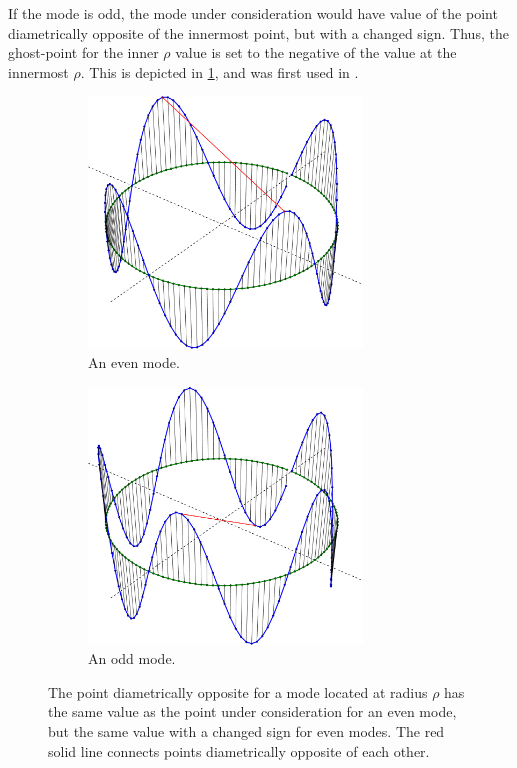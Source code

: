 If the mode is odd, the mode under consideration would have value of the point diametrically opposite of the innermost point, but with a changed sign.
Thus, the ghost-point for the inner $\rho$ value is set to the negative of the value at the innermost $\rho$.
This is depicted in \cref{fig:BCLaplace}, and was first used in \cite{Naulin2008}.
%
\begin{figure}[h!]
    \centering
    \begin{subfigure}[t]{0.5\textwidth}
        \centering
        \includegraphics[width=0.8\textwidth]{fig/mode_4}
        \caption{An even mode.}
    \end{subfigure}%
    \hfill
    \begin{subfigure}[t]{0.5\textwidth}
        \centering
        \includegraphics[width=0.8\textwidth]{fig/mode_5}
        \caption{An odd mode.}
    \end{subfigure}
        \caption{The point diametrically opposite for a mode located at radius $\rho$ has the same value as the point under consideration for an even mode, but the same value with a changed sign for even modes.
            The red solid line connects points diametrically opposite of each other.}
    \label{fig:BCLaplace}
\end{figure}

